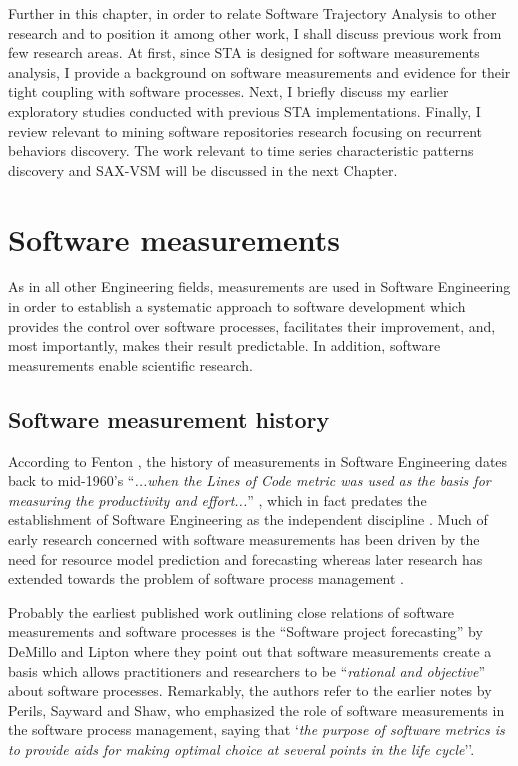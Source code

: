 Further in this chapter, in order to relate Software Trajectory Analysis to other research and to position it among 
other work, I shall discuss previous work from few research areas.
At first, since STA is designed for software measurements analysis, I provide a background on software 
measurements and evidence for their tight coupling with software processes. 
Next, I briefly discuss my earlier exploratory studies conducted with previous STA implementations. 
Finally, I review relevant to mining software repositories research focusing on recurrent behaviors discovery.
The work relevant to time series characteristic patterns discovery and SAX-VSM will be discussed in the next Chapter.

\section{Software measurements}
As in all other Engineering fields, measurements are used in Software Engineering in order to establish a 
systematic approach to software development which provides the control over software processes, facilitates
their improvement, and, most importantly, makes their result predictable. 
In addition, software measurements enable scientific research.

\subsection{Software measurement history}
According to Fenton \cite{citeulike:1525462}, the history of measurements in Software Engineering dates 
back to mid-1960's  ``\textit{...when the Lines of Code metric was used as the basis for measuring the 
productivity and effort...}'' , which in fact predates the establishment of Software Engineering as the 
independent discipline \cite{naur_crisis_68}. 
Much of early research concerned with software measurements has been driven by the need for resource model 
prediction and forecasting \cite{citeulike:1525462} whereas later research has extended towards the problem 
of software process management \cite{citeulike:13158802}.

Probably the earliest published work outlining close relations of software measurements and software 
processes is the ``Software project forecasting'' by DeMillo and Lipton \cite{demillo1980software} where they 
point out that software measurements create a basis which allows practitioners and researchers to be 
``\textit{rational and objective}'' about software processes. 
Remarkably, the authors refer to the earlier notes by Perils, Sayward and Shaw, who emphasized the role of software 
measurements in the software process management, saying that `\textit{the purpose of software metrics is 
to provide aids for making optimal choice at several points in the life cycle}''.


